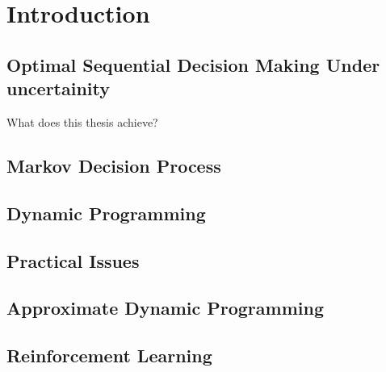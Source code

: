 \chapter{Introduction}
\section{Optimal Sequential Decision Making Under uncertainity}
What does this thesis achieve?
\section{Markov Decision Process}
\section {Dynamic Programming}
\section{Practical Issues}
\section{Approximate Dynamic Programming}
\section{Reinforcement Learning}
